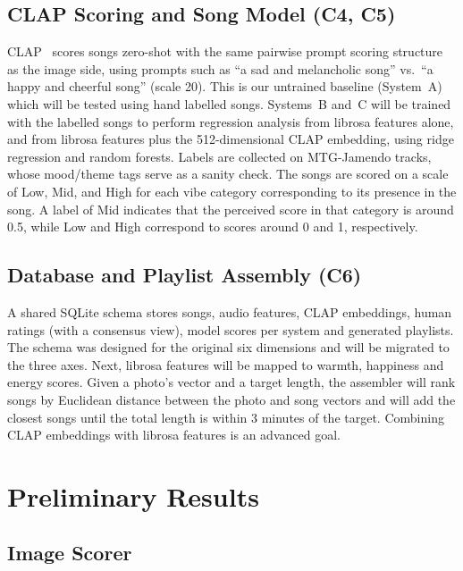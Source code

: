 \documentclass{article}
\begin{document}
\subsection{CLAP Scoring and Song Model (C4, C5)}\label{sec:clap}

CLAP~\cite{wu2023laionclap} scores songs zero-shot with the same pairwise
prompt scoring structure as the image side, using prompts such as ``a sad and
melancholic song'' vs.\ ``a happy and cheerful song'' (scale 20). This is our
untrained baseline (System~A) which will be tested using hand labelled songs. 
Systems~B and~C will be trained with the labelled songs to perform regression 
analysis from librosa features alone, and from librosa features plus the 512-dimensional CLAP
embedding, using ridge regression and random forests. Labels are collected on MTG-Jamendo tracks, whose mood/theme tags
serve as a sanity check. The songs are scored on a scale of Low, Mid, 
and High for each vibe category corresponding to its presence in the song. 
A label of Mid indicates that the perceived score in that category is around 0.5,
while Low and High correspond to scores around 0 and 1, respectively. 


\subsection{Database and Playlist Assembly (C6)}\label{sec:db}

A shared SQLite schema stores songs, audio features, CLAP embeddings, human
ratings (with a consensus view), model scores per system and generated
playlists. The schema was designed for the original six dimensions
and will be migrated to the three axes. Next, librosa features will be mapped
to warmth, happiness and energy scores. Given a photo's vector and a target length, the assembler will rank
songs by Euclidean distance between the photo and song vectors and will add the
closest songs until the total length is within 3 minutes of the target. Combining CLAP embeddings with librosa
features is an advanced goal.

\section{Preliminary Results}\label{sec:results}
\subsection{Image Scorer}
\end{document}
